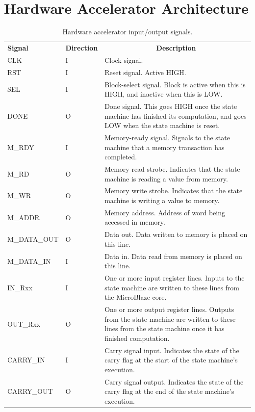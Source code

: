 \documentclass{UoYCSproject}
\begin{document}
\section{Hardware Accelerator Architecture}

\begin{table}[H]
\centering
\begin{tabular}{ |p{3cm}|p{2cm}|p{8cm}| }
\textbf{Signal} & \textbf{Direction} & \multicolumn{1}{c}{\textbf{Description}} \\
CLK             & I                  & Clock signal. \\[0.05cm]
RST             & I                  & Reset signal. Active HIGH. \\[0.05cm]
SEL             & I                  & Block-select signal. Block is active when this is HIGH, and inactive when this is LOW. \\[0.05cm]
DONE            & O                  & Done signal. This goes HIGH once the state machine has finished its computation, and goes LOW when the state machine is reset. \\[0.05cm]
M\_RDY          & I                  & Memory-ready signal. Signals to the state machine that a memory transaction has completed. \\[0.05cm]
M\_RD           & O                  & Memory read strobe. Indicates that the state machine is reading a value from memory. \\[0.05cm]
M\_WR           & O                  & Memory write strobe. Indicates that the state machine is writing a value to memory. \\[0.05cm]
M\_ADDR         & O                  & Memory address. Address of word being accessed in memory. \\[0.05cm]
M\_DATA\_OUT    & O                  & Data out. Data written to memory is placed on this line. \\[0.05cm]
M\_DATA\_IN     & I                  & Data in. Data read from memory is placed on this line. \\[0.05cm]
IN\_Rxx         & I                  & One or more input register lines. Inputs to the state machine are written to these lines from the MicroBlaze core. \\[0.05cm]
OUT\_Rxx        & O                  & One or more output register lines. Outputs from the state machine are written to these lines from the state machine once it has finished computation. \\[0.05cm]
CARRY\_IN       & I                  & Carry signal input. Indicates the state of the carry flag at the start of the state machine's execution. \\[0.05cm]
CARRY\_OUT      & O                  & Carry signal output. Indicates the state of the carry flag at the end of the state machine's execution.
\end{tabular}
\caption{Hardware accelerator input/output signals.}
\label{table:acceleratorSignals}
\end{table}
\end{document}
